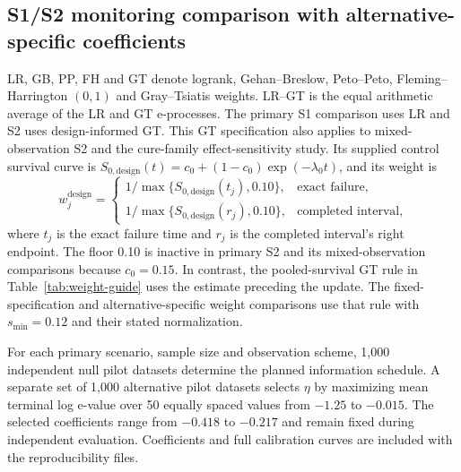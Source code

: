 \documentclass[12pt]{article}
\theoremstyle{definition}
\theoremstyle{remark}
\begin{document}
\subsection{S1/S2 monitoring comparison with alternative-specific coefficients}
\label{sec:app-monitoring-comparison}
LR, GB, PP, FH and GT denote logrank, Gehan--Breslow, Peto--Peto, Fleming--Harrington $(0,1)$ and Gray--Tsiatis weights. LR--GT is the equal arithmetic average of the LR and GT e-processes. The primary S1 comparison uses LR and S2 uses design-informed GT. This GT specification also applies to mixed-observation S2 and the cure-family effect-sensitivity study. Its supplied control survival curve is $S_{0,\mathrm{design}}(t)=c_0+(1-c_0)\exp(-\lambda_0t)$, and its weight is
\[
 w_j^{\mathrm{design}}=
 \begin{cases}
  1/\max\{S_{0,\mathrm{design}}(t_j),0.10\}, & \text{exact failure},\\
  1/\max\{S_{0,\mathrm{design}}(r_j),0.10\}, & \text{completed interval},
 \end{cases}
\]
where $t_j$ is the exact failure time and $r_j$ is the completed interval's right endpoint. The floor 0.10 is inactive in primary S2 and its mixed-observation comparisons because $c_0=0.15$. In contrast, the pooled-survival GT rule in Table~\ref{tab:weight-guide} uses the estimate preceding the update. The fixed-specification and alternative-specific weight comparisons use that rule with $s_{\min}=0.12$ and their stated normalization.

For each primary scenario, sample size and observation scheme, 1,000 independent null pilot datasets determine the planned information schedule. A separate set of 1,000 alternative pilot datasets selects $\eta$ by maximizing mean terminal log e-value over 50 equally spaced values from $-1.25$ to $-0.015$. The selected coefficients range from $-0.418$ to $-0.217$ and remain fixed during independent evaluation. Coefficients and full calibration curves are included with the reproducibility files.
\end{document}
